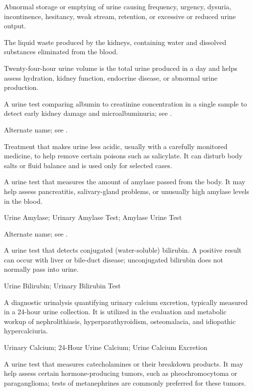  Abnormal storage or emptying of urine causing frequency, urgency, dysuria, incontinence, hesitancy, weak stream, retention, or excessive or reduced urine output.

 The liquid waste produced by the kidneys, containing water and dissolved substances eliminated from the blood.

 Twenty-four-hour urine volume is the total urine produced in a day and helps assess hydration, kidney function, endocrine disease, or abnormal urine production.

 A urine test comparing albumin to creatinine concentration in a single sample to detect early kidney damage and microalbuminuria; see .

 Alternate name; see .

 Treatment that makes urine less acidic, usually with a carefully monitored medicine, to help remove certain poisons such as salicylate. It can disturb body salts or fluid balance and is used only for selected cases.

 A urine test that measures the amount of amylase passed from the body. It may help assess pancreatitis, salivary-gland problems, or unusually high amylase levels in the blood.

\synonyms
Urine Amylase; Urinary Amylase Test; Amylase Urine Test

 Alternate name; see .

 A urine test that detects conjugated (water-soluble) bilirubin. A positive result can occur with liver or bile-duct disease; unconjugated bilirubin does not normally pass into urine.

\synonyms
Urine Bilirubin; Urinary Bilirubin Test

 A diagnostic urinalysis quantifying urinary calcium excretion, typically measured in a 24-hour urine collection. It is utilized in the evaluation and metabolic workup of nephrolithiasis, hyperparathyroidism, osteomalacia, and idiopathic hypercalciuria.

\synonyms
Urinary Calcium; 24-Hour Urine Calcium; Urine Calcium Excretion

 A urine test that measures catecholamines or their breakdown products. It may help assess certain hormone-producing tumors, such as pheochromocytoma or paraganglioma; tests of metanephrines are commonly preferred for these tumors.

